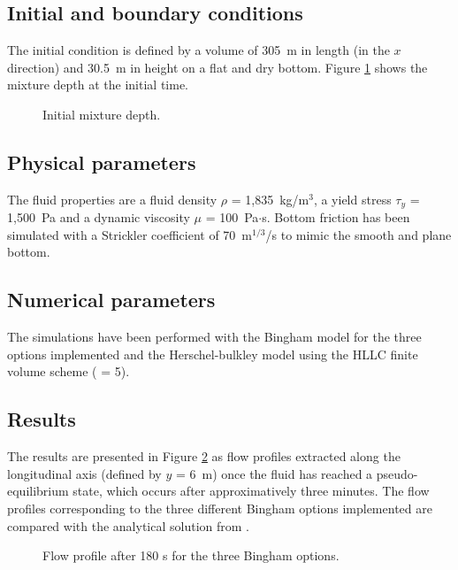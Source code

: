 \subsection{Initial and boundary conditions}

The initial condition is defined by a volume of 305~m in length
(in the $x$ direction) and 30.5~m in height on a flat and dry bottom.
Figure \ref{nnnewt:init} shows the mixture depth at the initial time.

\begin{figure}[!htbp]
 \centering
 \caption{Initial mixture depth.}
 \label{nnnewt:init}
\end{figure}

\subsection{Physical parameters}

The fluid properties are a fluid density $\rho$ = 1,835~kg/m$^3$, a yield stress
$\tau_y$ = 1,500~Pa and a dynamic viscosity $\mu$ = 100~Pa$\cdot$s.
Bottom friction has been simulated with a Strickler coefficient of
70~m$^{1/3}$/s to mimic the smooth and plane bottom.

\subsection{Numerical parameters}

The simulations have been performed with the Bingham model for the three options
implemented and the Herschel-bulkley model using the HLLC finite volume scheme
( = 5).

\subsection{Results}

The results are presented in Figure \ref{nnnewt:profilebingham} as flow profiles
extracted along the longitudinal axis (defined by $y$ = 6~m) once the fluid has
reached a pseudo-equilibrium state, which occurs after approximatively three minutes.
The flow profiles corresponding to the three different Bingham options
implemented are compared with the analytical solution from
\cite{naef2006comparison}.

\begin{figure}[!htbp]
 \centering
 \caption{Flow profile after 180 s for the three Bingham options.}
 \label{nnnewt:profilebingham}
\end{figure}

